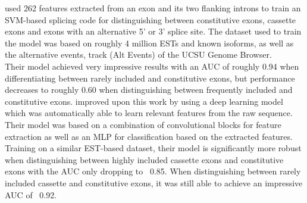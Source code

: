 \cite{buschhertel} used 262 features extracted from an exon and its two flanking introns to train an SVM-based splicing code for distinguishing between constitutive exons, cassette exons and exons with an alternative 5' or 3' splice site. The dataset used to train the model was based on roughly 4 million ESTs and known isoforms, as well as the alternative events, track (Alt Events) of the UCSU Genome Browser.\\
Their model achieved very impressive results with an AUC of roughly 0.94 when differentiating between rarely included and constitutive exons, but performance decreases to roughly 0.60 when distinguishing between frequently included and constitutive exons. \cite{dsc} improved upon this work by using a deep learning model which was automatically able to learn relevant features from the raw sequence. Their model was based on a combination of convolutional blocks for feature extraction as well as an MLP for classification based on the extracted features. Training on a similar EST-based dataset, their model is significantly more robust when distinguishing between highly included cassette exons and constitutive exons with the AUC only dropping to ~0.85. When distinguishing between rarely included cassette and constitutive exons, it was still able to achieve an impressive AUC of ~0.92.

